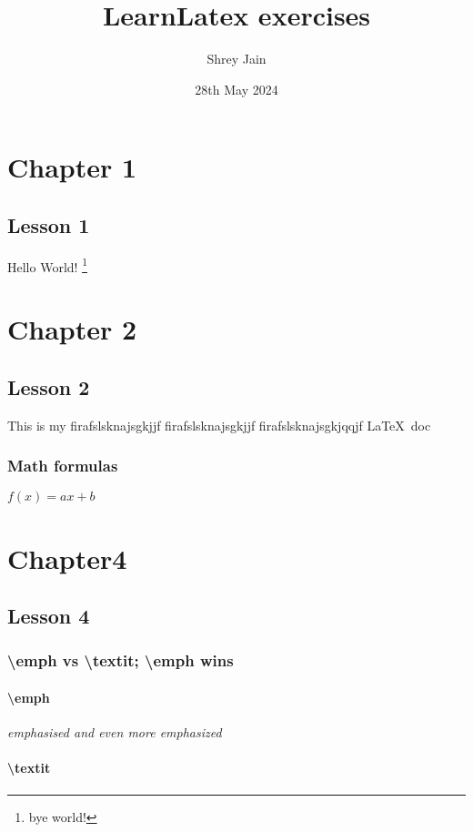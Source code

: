 \documentclass[a4paper, 12pt]{report}
\begin{document}
\author{Shrey Jain}
\title{LearnLatex exercises}
\date{28th May 2024}
\maketitle


\chapter{Chapter 1}
\section{Lesson 1}
Hello World! \footnote{bye world!}

\chapter{Chapter 2}
\section{Lesson 2}
This is my firafslsknajsgkjjf firafslsknajsgkjjf firafslsknajsgkjqqjf LaTeX~doc

\subsection{Math formulas}
\(f(x) = ax + b\)

\chapter{Chapter4}

\section{Lesson 4}

\subsection{\textbackslash emph vs \textbackslash textit; \textbackslash emph wins}
\subsubsection{\textbackslash emph}
\emph{emphasised and even more \emph{emphasized}} 

\subsubsection{\textbackslash textit}
\end{document}
